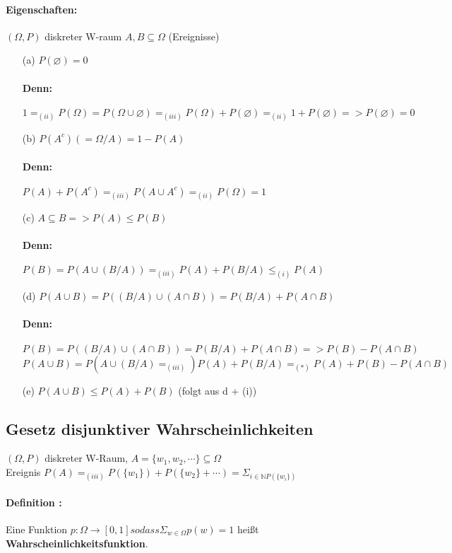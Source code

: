 \documentclass{article}
\begin{document}
\paragraph{Eigenschaften:} \((\Omega, P)\) diskreter W-raum \(A, B \subseteq \Omega\) (Ereignisse)
\begin{itemize}
    \item [(a)] \(P(\varnothing) = 0\) \paragraph*{Denn: } \(1 =_{(ii)} P(\Omega) = P(\Omega \cup \varnothing) =_{(iii)} P(\Omega) + P(\varnothing) =_{(ii)} 1 + P(\varnothing) => P(\varnothing) = 0 \)
    \item [(b)] \(P(A^c)(=\Omega/A) = 1 - P(A)\) \paragraph*{Denn:} \(P(A) + P(A^c) =_{(iii)} P(A \cup A^c) =_{(ii)} P(\Omega) = 1\)
    \item [(c)] \(A \subseteq B => P(A) \leq P(B)\) \paragraph*{Denn: } \(P(B) = P(A \cup (B/A)) =_{(iii)} P(A)+P(B/A) \leq_{(i)} P(A)\)
    \item [(d)] \(P(A \cup B) = P((B/A) \cup (A\cap B)) = P(B/A) + P(A\cap B)\) \paragraph*{Denn:} \(P(B) = P((B/A) \cup (A \cap B)) = P(B/A) + P(A \cap B) => P(B) - P(A\cap B)\) \\ \(P(A\cup B) = P(A \cup (B/A) =_{(iii)}) P(A) + P(B/A) =_{(*)} P(A) + P(B) - P(A \cap B)\)
    \item [(e)] \(P(A \cup B) \leq P(A) + P(B)\) (folgt aus d + (i))
\end{itemize}

\subsection*{Gesetz disjunktiver Wahrscheinlichkeiten}
\((\Omega, P)\) diskreter W-Raum, \(A = \{w_1, w_2, \cdots\} \subseteq \Omega\) \\ Ereignis \(P(A) =_{(iii)} P(\{w_1\}) + P(\{w_2\}+ \cdots) = \Sigma_{i \in \mathbb{N} P(\{w_i\})}\)
\paragraph*{Definition : } Eine Funktion \(p : \Omega \to [0, 1] sodass \Sigma_{w \in \Omega} p(w) = 1\) heißt \textbf{Wahrscheinlichkeitsfunktion}.
\end{document}
